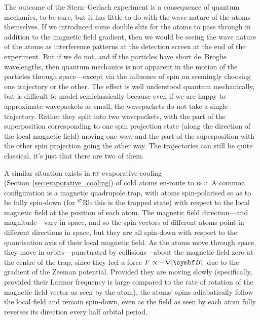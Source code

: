 The outcome of the Stern--Gerlach experiment is a consequence of quantum mechanics, to be sure, but it has little to do with the wave nature of the atoms themselves. If we introduced some double slits for the atoms to pass through in addition to the magnetic field gradient, then we would be seeing the wave nature of the atoms as interference patterns at the detection screen at the end of the experiment. But if we do not, and if the particles have short de~Broglie wavelengths, then quantum mechanics is not apparent in the motion of the particles through space---except via the influence of spin on seemingly choosing one trajectory or the other. The effect is well understood quantum mechanically, but is difficult to model semiclassically because even if we are happy to approximate wavepackets as small, the wavepackets do not take a single trajectory. Rather they split into two wavepackets, with the part of the superposition corresponding to one spin projection state (along the direction of the local magnetic field) moving one way, and the part of the superposition with the other spin projection going the other way. The trajectories can still be quite classical, it's just that there are two of them.

A similar situation exists in \textsc{rf} evaporative cooling (Section~\ref{sec:evaporative_cooling}) of cold atoms en-route to \textsc{bec}. A common configuration is a magnetic quadrupole trap, with atoms spin-polarised so as to be fully spin-down (for $^{87}$Rb this is the trapped state) with respect to the local magnetic field at the position of each atom. The magnetic field direction---and magnitude---vary in space, and so the spin vectors of different atoms point in different directions in space, but they are all spin-down with respect to the quantisation axis of their local magnetic field. As the atoms move through space, they move in orbits---punctuated by collisions---about the magnetic field zero at the centre of the trap, since they feel a force $F\propto-\nabla\abs{\vec B}$ due to the gradient of the Zeeman potential. Provided they are moving slowly (specifically, provided their Larmor frequency is large compared to the rate of rotation of the magnetic field vector as seen by the atom), the atoms' spins adiabatically follow the local field and remain spin-down, even as the field as seen by each atom fully reverses its direction every half orbital period.

